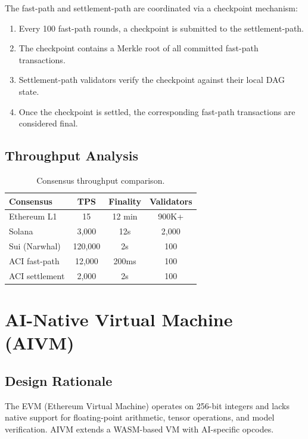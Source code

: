 \documentclass[11pt,twocolumn]{article}
\begin{document}
The fast-path and settlement-path are coordinated via a checkpoint mechanism:

\begin{enumerate}[leftmargin=1.4em]
    \item Every 100 fast-path rounds, a checkpoint is submitted to the settlement-path.
    \item The checkpoint contains a Merkle root of all committed fast-path transactions.
    \item Settlement-path validators verify the checkpoint against their local DAG state.
    \item Once the checkpoint is settled, the corresponding fast-path transactions are considered final.
\end{enumerate}

\subsection{Throughput Analysis}

\begin{table}[H]
\centering
\small
\begin{tabular}{lccc}
\toprule
\textbf{Consensus} & \textbf{TPS} & \textbf{Finality} & \textbf{Validators} \\
\midrule
Ethereum L1 & 15 & 12 min & 900K+ \\
Solana & 3,000 & 12s & 2,000 \\
Sui (Narwhal) & 120,000 & 2s & 100 \\
ACI fast-path & 12,000 & 200ms & 100 \\
ACI settlement & 2,000 & 2s & 100 \\
\bottomrule
\end{tabular}
\caption{Consensus throughput comparison.}
\label{tab:consensus}
\end{table}

\section{AI-Native Virtual Machine (AIVM)}
\label{sec:aivm}

\subsection{Design Rationale}

The EVM (Ethereum Virtual Machine) operates on 256-bit integers and lacks native support for floating-point arithmetic, tensor operations, and model verification. AIVM extends a WASM-based VM with AI-specific opcodes.
\end{document}
